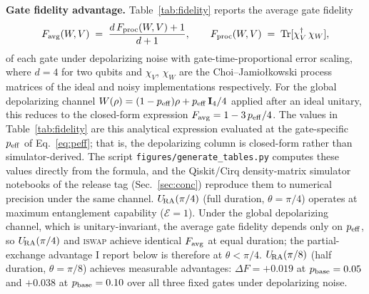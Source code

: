 \textbf{Gate fidelity advantage.}
Table~\ref{tab:fidelity} reports the average gate
fidelity~\cite{Nielsen2002Fidelity}
\begin{equation}
  F_{\rm avg}(W, V) \;=\; \frac{d\,F_{\rm proc}(W, V) + 1}{d + 1},
  \qquad
  F_{\rm proc}(W, V) \;=\; \mathrm{Tr}[\chi_V^\dagger\,\chi_W],
  \label{eq:favg}
\end{equation}
of each gate under depolarizing noise with gate-time-proportional
error scaling, where $d = 4$ for two qubits and $\chi_V$, $\chi_W$ are
the Choi--Jamio\l{}kowski process matrices of the ideal and noisy
implementations respectively.
For the global depolarizing channel $W(\rho) = (1-p_{\rm eff})\rho +
p_{\rm eff}\,\mathbf{I}_4/4$ applied after an ideal unitary, this
reduces to the closed-form expression
$F_{\rm avg} = 1 - 3\,p_{\rm eff}/4$.
The values in Table~\ref{tab:fidelity} are this analytical expression
evaluated at the gate-specific $p_{\rm eff}$ of Eq.~\eqref{eq:peff}; that is, the depolarizing column is closed-form
rather than simulator-derived.
The script \texttt{figures/\allowbreak generate\_\allowbreak tables.py} computes these values
directly from the formula, and the Qiskit/Cirq density-matrix
simulator notebooks of the release tag (Sec.~\ref{sec:conc}) reproduce
them to numerical precision under the same channel.
$U_{\!\mathrm{RA}}(\pi/4)$ (full duration, $\theta = \pi/4$) operates at maximum
entanglement capability ($\mathcal{E} = 1$).
Under the global depolarizing channel, which is unitary-invariant, the average gate fidelity depends only on $p_{\rm eff}$, so $U_{\!\mathrm{RA}}(\pi/4)$ and
\textsc{iswap} achieve identical $F_{\rm avg}$ at equal duration; the
partial-exchange advantage I report below is therefore at $\theta < \pi/4$.
$U_{\!\mathrm{RA}}(\pi/8)$ (half duration, $\theta = \pi/8$) achieves measurable
advantages: $\Delta F = +0.019$ at $p_{\rm base} = 0.05$ and $+0.038$ at
$p_{\rm base} = 0.10$ over all three fixed gates under depolarizing noise.

